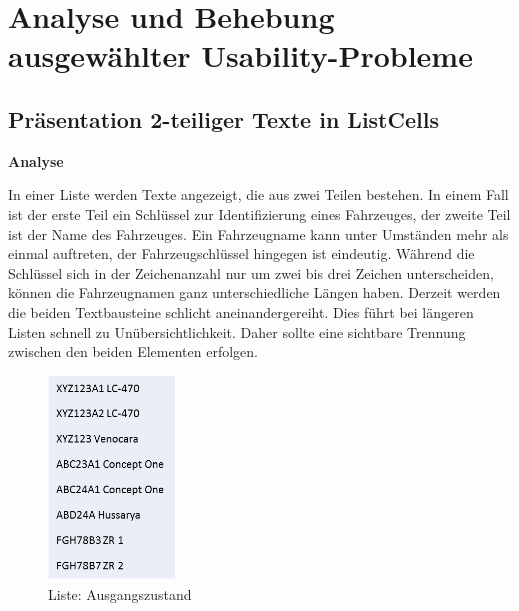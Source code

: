 \chapter{Analyse und Behebung ausgewählter Usability-Probleme}
\section{Präsentation 2-teiliger Texte in ListCells} \label{sec:analyseListCells}
\textbf{Analyse}

In einer Liste werden Texte angezeigt, die aus zwei Teilen bestehen. In einem Fall ist der erste Teil ein Schlüssel zur Identifizierung eines Fahrzeuges, der zweite Teil ist der Name des Fahrzeuges. Ein Fahrzeugname kann unter Umständen mehr als einmal auftreten, der Fahrzeugschlüssel hingegen ist eindeutig. Während die Schlüssel sich in der Zeichenanzahl nur um zwei bis drei Zeichen unterscheiden, können die Fahrzeugnamen ganz unterschiedliche Längen haben. Derzeit werden die beiden Textbausteine schlicht aneinandergereiht. Dies führt bei längeren Listen schnell zu Unübersichtlichkeit. Daher sollte eine sichtbare Trennung zwischen den beiden Elementen erfolgen.

\begin{figure}[H]
 \centering
 \includegraphics[width=0.3\textwidth]{grafiken/Liste_Beispiel.png}
 \caption{Liste: Ausgangszustand}
 \label{fig:liste1}
\end{figure}

